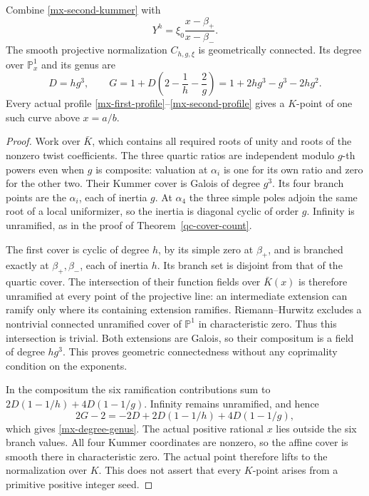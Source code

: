 \begin{theorem}\label{mx-cover}
Combine \eqref{mx-second-kummer} with
\begin{equation}\label{mx-cover-first-equation}
 Y^h=\xi_0\frac{x-\beta_+}{x-\beta_-}.
\end{equation}
The smooth projective normalization $C_{h,g,\xi}$ is geometrically
connected. Its degree over $\mathbb P^1_x$ and its genus are
\begin{equation}\label{mx-degree-genus}
 D=hg^3,\qquad
 G=1+D\left(2-\frac1h-\frac2g\right)
   =1+2hg^3-g^3-2hg^2.
\end{equation}
Every actual profile \eqref{mx-first-profile}--\eqref{mx-second-profile}
gives a $K$-point of one such curve above $x=a/b$.
\end{theorem}
\begin{proof}
Work over $\bar K$, which contains all required roots of unity
and roots of the nonzero twist coefficients. The three quartic
ratios are independent modulo $g$-th powers even when $g$ is
composite: valuation at $\alpha_i$ is one for its own ratio and
zero for the other two. Their Kummer cover is Galois of degree
$g^3$. Its four branch points are the $\alpha_i$, each of inertia
$g$. At $\alpha_4$ the three simple poles adjoin the same root of
a local uniformizer, so the inertia is diagonal cyclic of order
$g$. Infinity is unramified, as in the proof of
Theorem~\ref{qc-cover-count}.

The first cover is cyclic of degree $h$, by its simple zero at
$\beta_+$, and is branched exactly at $\beta_+,\beta_-$,
each of inertia $h$. Its branch set is disjoint from that of the
quartic cover. The intersection of their function fields over
$\bar K(x)$ is therefore unramified at every point of the
projective line: an intermediate extension can ramify only where
its containing extension ramifies. Riemann--Hurwitz excludes a
nontrivial connected unramified cover of $\mathbb P^1$ in
characteristic zero. Thus this intersection is trivial. Both
extensions are Galois, so their compositum is a field of degree
$hg^3$. This proves geometric connectedness without any
coprimality condition on the exponents.

In the compositum the six ramification contributions sum to
$2D(1-1/h)+4D(1-1/g)$. Infinity remains unramified, and hence
\[
 2G-2=-2D+2D(1-1/h)+4D(1-1/g),
\]
which gives \eqref{mx-degree-genus}. The actual positive rational
$x$ lies outside the six branch values. All four Kummer coordinates
are nonzero, so the affine cover is smooth there in characteristic
zero. The actual point therefore lifts to the normalization over
$K$. This does not assert that every $K$-point arises from a
primitive positive integer seed.
\end{proof}

